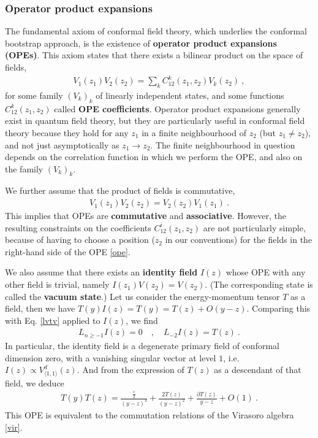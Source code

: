 \documentclass[12pt, a4paper]{article}
\newcommand{\myindex}[1]{\textbf{\boldmath #1}}
\begin{document}
\subsubsection{Operator product expansions}\label{sec:ope}

The fundamental axiom of conformal field theory, which underlies the conformal bootstrap approach, is the existence of \myindex{operator product expansions (OPEs)}. This axiom states that there exists a bilinear product on the space of fields, 
\begin{align}
  \boxed{V_1(z_1)V_2(z_2) = \sum_{k} C^k_{12}(z_1,z_2) V_k(z_2)}\ ,
  \label{ope}
 \end{align}
 for some family $(V_k)_{k}$ of linearly independent states, and
some functions $C^k_{12}(z_1,z_2)$ called \myindex{OPE coefficients}. Operator product expansions generally exist in quantum field theory, but they are particularly useful in conformal field theory because they hold for any $z_1$ in a finite neighbourhood of $z_2$ (but $z_1\neq z_2$), and not just asymptotically as $z_1\to z_2$. The finite neighbourhood in question depends on the correlation function in which we perform the OPE, and also on the family $(V_k)_{k}$.

We further assume that the product of fields is commutative,
\begin{align}
 \boxed{V_1(z_1)V_2(z_2) = V_2(z_2)V_1(z_1)}\ .
 \label{comm}
\end{align}
This implies that OPEs are \myindex{commutative} and \myindex{associative}. However, the resulting constraints on the coefficients $C^i_{12}(z_1,z_2)$ are not particularly simple, because of having to choose a position ($z_2$ in our conventions) for the fields in the right-hand side of the OPE \eqref{ope}. 

We also assume that there exists an \myindex{identity field} $I(z)$ whose OPE with any other field is trivial, namely $I(z_1)V(z_2) = V(z_2)$. (The corresponding state is called the \myindex{vacuum state}.) Let us consider the energy-momentum tensor $T$ as a field, then we have
$
 T(y)I(z) = T(y) = T(z)  + O(y-z)
$. 
Comparing this with Eq. \eqref{lvtv} applied to $I(z)$, we find 
\begin{align}
 L_{n\geq -1} I(z) = 0 \quad , \quad L_{-2}I(z)=T(z) \ .
\end{align}
In particular, the identity field is a degenerate primary field of conformal dimension zero, with a vanishing singular vector at level $1$, i.e. $I(z) \propto V^d_{\langle 1,1\rangle}(z)$. And from the expression of $T(z)$ as a descendant of that field, we deduce
\begin{align}
 T(y)T(z) = \frac{\frac{c}{2}}{(y-z)^4} + \frac{2T(z)}{(y-z)^2} + \frac{\partial T(z)}{y-z} + O(1)\ .
\label{tt}
\end{align}
This OPE is equivalent to the commutation relations of the Virasoro algebra \eqref{vir}.
\end{document}
